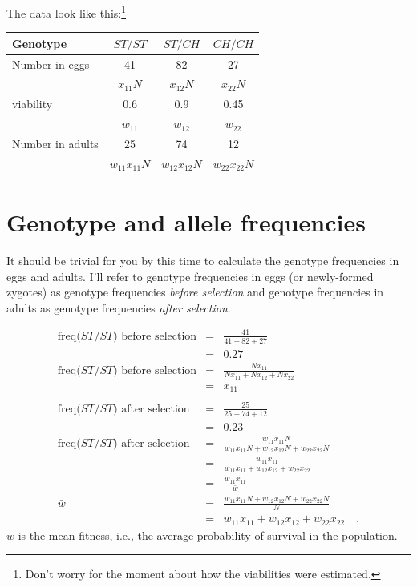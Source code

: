 The data look like this:\footnote{Don't worry for the moment about how
the viabilities were estimated.}

\begin{center}
\begin{tabular}{l|ccc}
\hline\hline
Genotype         & $ST/ST$    & $ST/CH$    & $CH/CH$    \\
\hline
Number in eggs   & 41       & 82       & 27       \\
                 & $x_{11}N$  & $x_{12}N$  & $x_{22}N$  \\
viability        & 0.6      & 0.9      & 0.45     \\
                 & $w_{11}$   & $w_{12}$   & $w_{22}$   \\
Number in adults & 25       & 74       & 12       \\
                 & $w_{11}x_{11}N$ & $w_{12}x_{12}N$ & $w_{22}x_{22}N$ \\
\hline
\end{tabular}
\end{center}

\section*{Genotype and allele frequencies}

It should be trivial for you by this time to calculate the genotype
frequencies in eggs and adults. I'll refer to genotype frequencies in
eggs (or newly-formed zygotes) as genotype frequencies {\it before
  selection\/} and genotype frequencies in adults as genotype
frequencies {\it after selection}.

\begin{eqnarray*}
\mbox{freq($ST/ST$) before selection}
 &=& \frac{41}{41 + 82 + 27} \\
 &=& 0.27 \\
\mbox{freq($ST/ST$) before selection}
 &=& \frac{Nx_{11}}{Nx_{11} + Nx_{12} + Nx_{22}} \\
 &=& x_{11} \\
 && \\
\mbox{freq($ST/ST$) after selection}
 &=& \frac{25}{25 + 74 +12} \\
 &=& 0.23 \\
\mbox{freq($ST/ST$) after selection}
 &=& \frac{w_{11}x_{11}N}{w_{11}x_{11}N + w_{12}x_{12}N + w_{22}x_{22}N} \\
 &=& \frac{w_{11}x_{11}}{w_{11}x_{11} + w_{12}x_{12} +
 w_{22}x_{22}} \\
 &=& \frac{w_{11}x_{11}}{\bar w} \\
 \bar w &=& \frac{w_{11}x_{11}N + w_{12}x_{12}N + w_{22}x_{22}N}{N} \\
        &=& w_{11}x_{11} + w_{12}x_{12} + w_{22}x_{22} \quad .
\end{eqnarray*}
$\bar w$ is the mean fitness, i.e., the average probability of
survival in the population.

